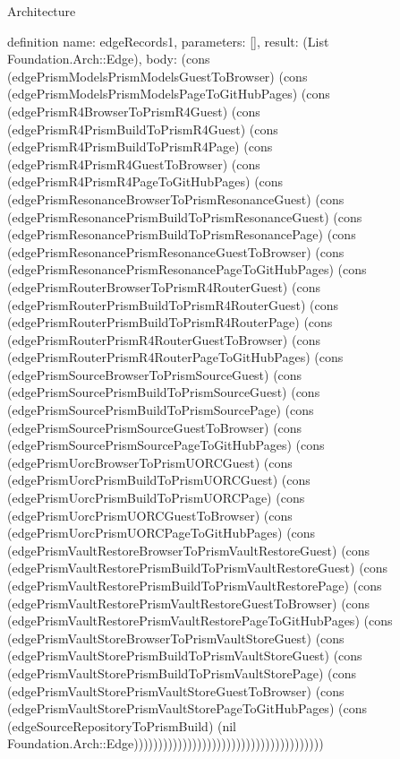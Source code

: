 \begin{lexlean}{Architecture}
\begin{semanticmodule}
definition{
  name: edgeRecords1,
  parameters: [],
  result: (List Foundation.Arch::Edge),
  body: (cons (edgePrismModelsPrismModelsGuestToBrowser) (cons (edgePrismModelsPrismModelsPageToGitHubPages) (cons (edgePrismR4BrowserToPrismR4Guest) (cons (edgePrismR4PrismBuildToPrismR4Guest) (cons (edgePrismR4PrismBuildToPrismR4Page) (cons (edgePrismR4PrismR4GuestToBrowser) (cons (edgePrismR4PrismR4PageToGitHubPages) (cons (edgePrismResonanceBrowserToPrismResonanceGuest) (cons (edgePrismResonancePrismBuildToPrismResonanceGuest) (cons (edgePrismResonancePrismBuildToPrismResonancePage) (cons (edgePrismResonancePrismResonanceGuestToBrowser) (cons (edgePrismResonancePrismResonancePageToGitHubPages) (cons (edgePrismRouterBrowserToPrismR4RouterGuest) (cons (edgePrismRouterPrismBuildToPrismR4RouterGuest) (cons (edgePrismRouterPrismBuildToPrismR4RouterPage) (cons (edgePrismRouterPrismR4RouterGuestToBrowser) (cons (edgePrismRouterPrismR4RouterPageToGitHubPages) (cons (edgePrismSourceBrowserToPrismSourceGuest) (cons (edgePrismSourcePrismBuildToPrismSourceGuest) (cons (edgePrismSourcePrismBuildToPrismSourcePage) (cons (edgePrismSourcePrismSourceGuestToBrowser) (cons (edgePrismSourcePrismSourcePageToGitHubPages) (cons (edgePrismUorcBrowserToPrismUORCGuest) (cons (edgePrismUorcPrismBuildToPrismUORCGuest) (cons (edgePrismUorcPrismBuildToPrismUORCPage) (cons (edgePrismUorcPrismUORCGuestToBrowser) (cons (edgePrismUorcPrismUORCPageToGitHubPages) (cons (edgePrismVaultRestoreBrowserToPrismVaultRestoreGuest) (cons (edgePrismVaultRestorePrismBuildToPrismVaultRestoreGuest) (cons (edgePrismVaultRestorePrismBuildToPrismVaultRestorePage) (cons (edgePrismVaultRestorePrismVaultRestoreGuestToBrowser) (cons (edgePrismVaultRestorePrismVaultRestorePageToGitHubPages) (cons (edgePrismVaultStoreBrowserToPrismVaultStoreGuest) (cons (edgePrismVaultStorePrismBuildToPrismVaultStoreGuest) (cons (edgePrismVaultStorePrismBuildToPrismVaultStorePage) (cons (edgePrismVaultStorePrismVaultStoreGuestToBrowser) (cons (edgePrismVaultStorePrismVaultStorePageToGitHubPages) (cons (edgeSourceRepositoryToPrismBuild) (nil Foundation.Arch::Edge)))))))))))))))))))))))))))))))))))))))
}


\end{semanticmodule}
\end{lexlean}
